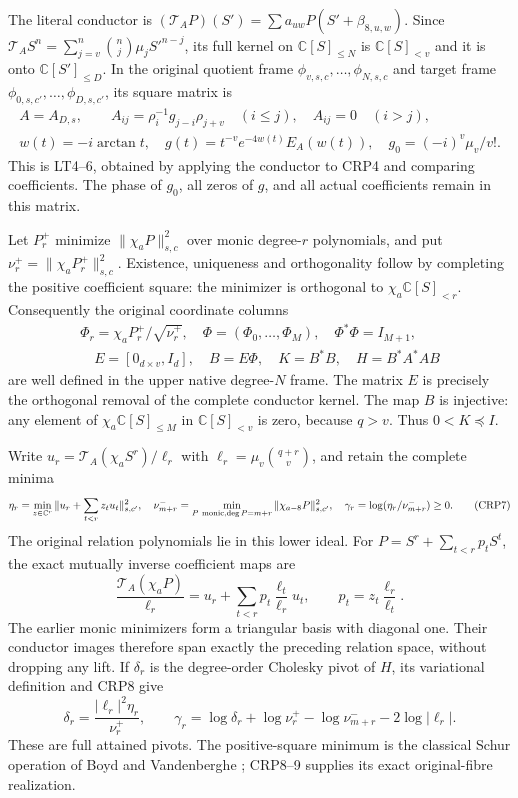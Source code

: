 \documentclass[11pt,a4paper]{article}
\begin{document}
The literal conductor is $(\mathcal T_AP)(S')=
\sum a_{uw}P(S'+\beta_{8,u,w})$. Since
$\mathcal T_AS^n=\sum_{j=v}^n\binom nj\mu_j S'^{n-j}$, its full
kernel on $\mathbb C[S]_{\le N}$ is $\mathbb C[S]_{<v}$ and it is
onto $\mathbb C[S']_{\le D}$. In the original quotient frame
$\phi_{v,s,c},\ldots,\phi_{N,s,c}$ and target frame
$\phi_{0,s,c'},\ldots,\phi_{D,s,c'}$, its square matrix is
\[
\begin{gathered}
A=A_{D,s},\qquad A_{ij}=\rho_i^{-1}g_{j-i}\rho_{j+v}\quad(i\le j),
\quad A_{ij}=0\quad(i>j),\\
w(t)=-i\arctan t,\quad g(t)=t^{-v}e^{-4w(t)}E_A(w(t)),
\quad g_0=(-i)^v\mu_v/v!.\tag{CRP5}
\end{gathered}
\]
This is LT4--6, obtained by applying the conductor to CRP4 and comparing
coefficients. The phase of $g_0$, all zeros of $g$, and all actual
coefficients remain in this matrix.

Let $P_r^+$ minimize $\|\chi_aP\|_{s,c}^2$ over monic degree-$r$
polynomials, and put $\nu_r^+=\|\chi_aP_r^+\|_{s,c}^2$.
Existence, uniqueness and orthogonality follow by completing the
positive coefficient square: the minimizer is orthogonal to
$\chi_a\mathbb C[S]_{<r}$. Consequently the original coordinate
columns
\[
\begin{gathered}
\Phi_r=\chi_aP_r^+/\sqrt{\nu_r^+},\quad
\Phi=(\Phi_0,\ldots,\Phi_M),\quad\Phi^*\Phi=I_{M+1},\\
\quad E=[0_{d\times v},I_d],\quad B=E\Phi,
\quad K=B^*B,\quad H=B^*A^*AB
\end{gathered}\tag{CRP6}
\]
are well defined in the upper native degree-$N$ frame. The matrix $E$
is precisely the orthogonal removal of the complete conductor kernel.
The map $B$ is injective: any element of $\chi_a\mathbb C[S]_{\le M}$
in $\mathbb C[S]_{<v}$ is zero, because $q>v$. Thus $0<K\preceq I$.

Write $u_r=\mathcal T_A(\chi_aS^r)/\ell_r$ with
$\ell_r=\mu_v\binom{q+r}{v}$, and retain the complete minima
\[
\eta_r=\min_{z\in\mathbb C^r}\|u_r+\sum_{t<r}z_tu_t\|_{s,c'}^2,
\quad\nu^-_{m+r}=\min_{P\ {\rm monic},\deg P=m+r}
 \|\chi_{a-8}P\|_{s,c'}^2,
\quad\gamma_r=\log(\eta_r/\nu^-_{m+r})\ge0.\tag{CRP7}
\]
The original relation polynomials lie in this lower ideal. For
$P=S^r+\sum_{t<r}p_tS^t$, the exact mutually inverse coefficient maps are
\[
\frac{\mathcal T_A(\chi_aP)}{\ell_r}
 =u_r+\sum_{t<r}p_t\frac{\ell_t}{\ell_r}u_t,
\qquad p_t=z_t\frac{\ell_r}{\ell_t}.\tag{CRP8}
\]
The earlier monic minimizers form a triangular basis with diagonal one.
Their conductor images therefore span exactly the preceding relation
space, without dropping any lift. If $\delta_r$ is the degree-order
Cholesky pivot of $H$, its variational definition and CRP8 give
\[
\boxed{\delta_r=\frac{|\ell_r|^2\eta_r}{\nu_r^+},\qquad
\gamma_r=\log\delta_r+\log\nu_r^+-\log\nu^-_{m+r}
                         -2\log|\ell_r|.}\tag{CRP9}
\]
These are full attained pivots. The positive-square minimum is the
classical Schur operation of Boyd and Vandenberghe
\cite[Appendix A.5.5, p.~650]{human:boyd-vandenberghe}; CRP8--9 supplies
its exact original-fibre realization.
\end{document}

